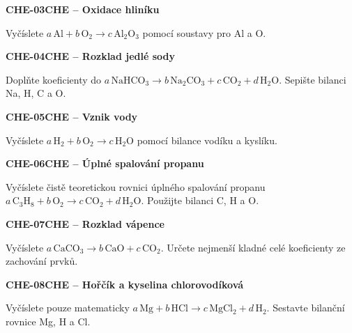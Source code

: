\documentclass[11pt,a4paper]{article}
\begin{document}
\vspace{4mm}\par\noindent\dotfill\par\medskip
\par\medskip\noindent\textbf{CHE-03}\quad\textbf{CHE -- Oxidace hliníku}\par
Vyčíslete $a\,\mathrm{Al}+b\,\mathrm{O_2}\rightarrow c\,\mathrm{Al_2O_3}$ pomocí soustavy pro Al a O.

\vspace{4mm}\par\noindent\dotfill\par\medskip
\par\medskip\noindent\textbf{CHE-04}\quad\textbf{CHE -- Rozklad jedlé sody}\par
Doplňte koeficienty do $a\,\mathrm{NaHCO_3}\rightarrow b\,\mathrm{Na_2CO_3}+c\,\mathrm{CO_2}+d\,\mathrm{H_2O}$. Sepište bilanci Na, H, C a O.

\vspace{4mm}\par\noindent\dotfill\par\medskip
\par\medskip\noindent\textbf{CHE-05}\quad\textbf{CHE -- Vznik vody}\par
Vyčíslete $a\,\mathrm{H_2}+b\,\mathrm{O_2}\rightarrow c\,\mathrm{H_2O}$ pomocí bilance vodíku a kyslíku.

\vspace{4mm}\par\noindent\dotfill\par\medskip
\par\medskip\noindent\textbf{CHE-06}\quad\textbf{CHE -- Úplné spalování propanu}\par
Vyčíslete čistě teoretickou rovnici úplného spalování propanu $a\,\mathrm{C_3H_8}+b\,\mathrm{O_2}\rightarrow c\,\mathrm{CO_2}+d\,\mathrm{H_2O}$. Použijte bilanci C, H a O.

\vspace{4mm}\par\noindent\dotfill\par\medskip
\par\medskip\noindent\textbf{CHE-07}\quad\textbf{CHE -- Rozklad vápence}\par
Vyčíslete $a\,\mathrm{CaCO_3}\rightarrow b\,\mathrm{CaO}+c\,\mathrm{CO_2}$. Určete nejmenší kladné celé koeficienty ze zachování prvků.

\vspace{4mm}\par\noindent\dotfill\par\medskip
\par\medskip\noindent\textbf{CHE-08}\quad\textbf{CHE -- Hořčík a kyselina chlorovodíková}\par
Vyčíslete pouze matematicky $a\,\mathrm{Mg}+b\,\mathrm{HCl}\rightarrow c\,\mathrm{MgCl_2}+d\,\mathrm{H_2}$. Sestavte bilanční rovnice Mg, H a Cl.
\end{document}
